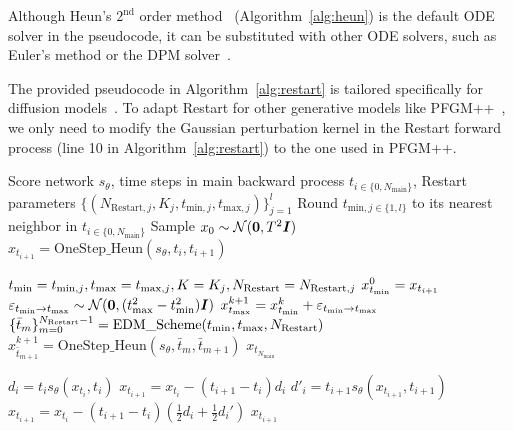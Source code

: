 Although Heun's $2^{\textrm{nd}}$ order method~\cite{Ascher1998ComputerMF} (Algorithm~\ref{alg:heun}) is the default ODE solver in the pseudocode, it can be substituted with other ODE solvers, such as Euler's method or the DPM solver~\cite{lu2022dpm}. 

The provided pseudocode in Algorithm~\ref{alg:restart} is tailored specifically for diffusion models~\cite{Karras2022ElucidatingTD}. To adapt Restart for other generative models like PFGM++~\cite{Xu2023PFGMUT}, we only need to modify the Gaussian perturbation kernel in the Restart forward process (line 10 in Algorithm~\ref{alg:restart}) to the one used in PFGM++.

\begin{algorithm}[h]
  \caption{Restart sampling}
  \label{alg:restart}
\begin{algorithmic}[1]
   Score network $s_\theta$, time steps in main backward process $t_{i \in \{0, N_{\textrm{main}}\}}$, Restart parameters $\{(N_{\textrm{Restart}, j}, K_j, t_{\textrm{min}, j}, t_{\textrm{max}, j})\}_{j=1}^l$ 
  \State Round $t_{\textrm{min}, j\in \{1, l\}}$ to its nearest neighbor in $t_{i \in \{0, N_{\textrm{main}}\}}$
  \State Sample $x_0 \sim {\mathcal{N}}(\bm{0}, T^2\bm{I})$
  \State $x_{t_{i+1}}=\textrm{OneStep\_Heun}(s_\theta, t_i, t_{i+1})$
    
    \State $t_{\textrm{min}} = t_{\textrm{min}, j}, t_{\textrm{max}} = t_{\textrm{max}, j}, K=K_j, N_{\textrm{Restart}} = N_{\textrm{Restart}, j}$
    \State $x^0_{t_{\textrm{min}}} = x_{t_{i+1}}$
      \State $\varepsilon_{t_{\textrm{min}} \to t_{\textrm{max}}} \sim  {\mathcal{N}}(\bm{0}, (t_{\textrm{max}}^2-t_{\textrm{min}}^2)\bm{I})$
          \State $x^{k+1}_{t_{\textrm{max}}} = x^k_{t_{\textrm{min}}} + \varepsilon_{t_{\textrm{min}} \to t_{\textrm{max}}}$ 
          \State $\{\bar{t}_{m}\}_{m=0}^{N_{\textrm{Restart}}-1} = \textrm{EDM\_Scheme}(t_{\textrm{min}}, t_{\textrm{max}},N_{\textrm{Restart} })$
          \State $x^{k+1}_{\bar{t}_{m+1}}=\textrm{OneStep\_Heun}(s_\theta, \bar{t}_{m}, \bar{t}_{m+1})$
          \EndFor
      \EndFor
    \EndIf
  \EndFor
  \Return $x_{t_{N_{\textrm{main}}}}$
\end{algorithmic}
\end{algorithm}

\begin{algorithm}[htb]
  \caption{{OneStep\_Heun($s_\theta, x_{t_i}, t_i, t_{i+1}$)}}
  \label{alg:heun}
\begin{algorithmic}[1]
    \State $d_i = t_is_\theta(x_{t_i}, t_i)$
  \State $x_{t_{i+1}} = x_{t_i} - (t_{i+1}-t_i) d_i$
  \State $d'_i = t_{i+1}s_\theta(x_{t_{i+1}}, t_{i+1})$
  \State $x_{t_{i+1}} = x_{t_i} - (t_{i+1}-t_i)(\frac12d_i+\frac12d_i')$
  \EndIf
  \Return $x_{t_{i+1}}$
\end{algorithmic}
\end{algorithm}

